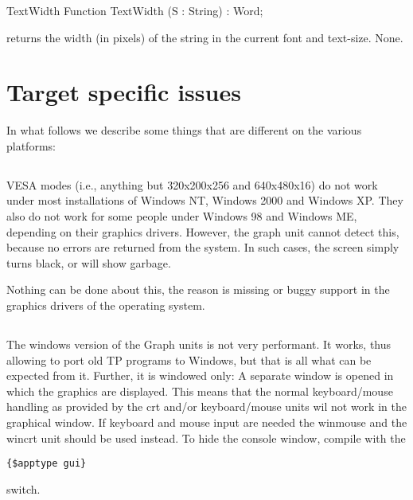 \begin{function}{TextWidth}
\Declaration
Function TextWidth (S : String) : Word;

\Description
{} returns the width (in pixels) of the string  in
the current font and text-size.
\Errors
None.
\SeeAlso
{}
\end{function}

\section{Target specific issues}                                                                                                                                                                                                                                                               
In what follows we describe some things that are different on the various
platforms:

\subsection{\dos}
VESA modes (i.e., anything but 320x200x256 and 640x480x16) do not work 
under most installations of Windows NT, Windows 2000 and Windows XP. 
They also do not work for some people under Windows 98 and Windows ME, 
depending on their graphics drivers. However, the graph unit cannot 
detect this, because no errors are returned from the system. 
In such cases, the screen simply turns black, or will show garbage.

Nothing can be done about this, the reason is missing or buggy
support in the graphics drivers of the operating system.

\subsection{\windows}
The windows version of the Graph units is not very performant. It works,
thus allowing to port old TP programs to Windows, but that is all what can
be expected from it. Further, it is windowed only: A separate window is
opened in which the graphics are displayed. This means that the normal 
keyboard/mouse handling as provided by the crt and/or keyboard/mouse units
wil not work in the graphical window. If keyboard and mouse input are needed
the winmouse and the wincrt unit should be used instead. 
To hide the console window, compile with the
\begin{verbatim}
{$apptype gui}
\end{verbatim}
switch.

